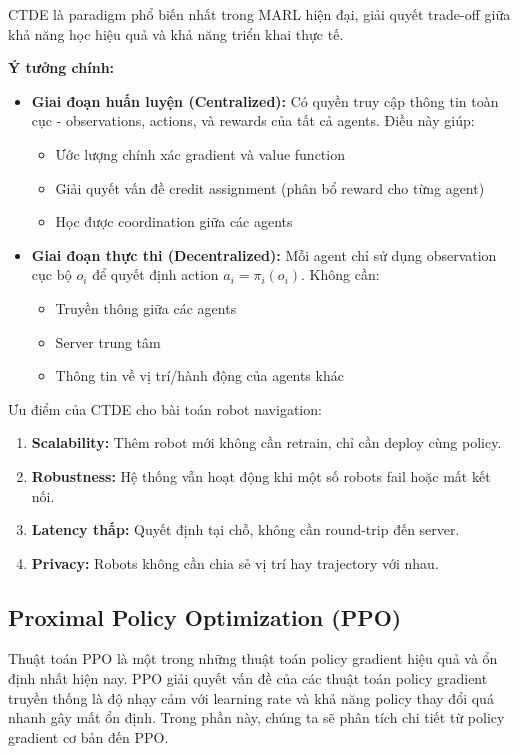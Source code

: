 CTDE là paradigm phổ biến nhất trong MARL hiện đại, giải quyết trade-off giữa khả năng học hiệu quả và khả năng triển khai thực tế.

\textbf{Ý tưởng chính:}
\begin{itemize}
\item \textbf{Giai đoạn huấn luyện (Centralized):} Có quyền truy cập thông tin toàn cục - observations, actions, và rewards của tất cả agents. Điều này giúp:
\begin{itemize}
    \item Ước lượng chính xác gradient và value function
    \item Giải quyết vấn đề credit assignment (phân bổ reward cho từng agent)
    \item Học được coordination giữa các agents
\end{itemize}

\item \textbf{Giai đoạn thực thi (Decentralized):} Mỗi agent chỉ sử dụng observation cục bộ $o_i$ để quyết định action $a_i = \pi_i(o_i)$. Không cần:
\begin{itemize}
    \item Truyền thông giữa các agents
    \item Server trung tâm
    \item Thông tin về vị trí/hành động của agents khác
\end{itemize}
\end{itemize}

Ưu điểm của CTDE cho bài toán robot navigation:
\begin{enumerate}
\item \textbf{Scalability:} Thêm robot mới không cần retrain, chỉ cần deploy cùng policy.
\item \textbf{Robustness:} Hệ thống vẫn hoạt động khi một số robots fail hoặc mất kết nối.
\item \textbf{Latency thấp:} Quyết định tại chỗ, không cần round-trip đến server.
\item \textbf{Privacy:} Robots không cần chia sẻ vị trí hay trajectory với nhau.
\end{enumerate}

\subsection{Proximal Policy Optimization (PPO)}
\label{subsec:ppo}

Thuật toán PPO \cite{schulman2017proximal} là một trong những thuật toán policy gradient hiệu quả và ổn định nhất hiện nay. PPO giải quyết vấn đề của các thuật toán policy gradient truyền thống là độ nhạy cảm với learning rate và khả năng policy thay đổi quá nhanh gây mất ổn định. Trong phần này, chúng ta sẽ phân tích chi tiết từ policy gradient cơ bản đến PPO.

